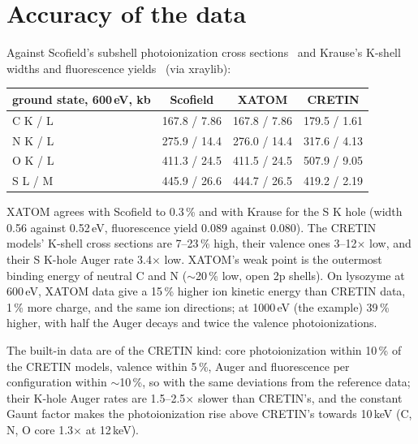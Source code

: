 \section{Accuracy of the data}
\label{sec:accuracy}

Against Scofield's subshell photoionization cross sections~\cite{scofield1973} and Krause's K-shell widths and
fluorescence yields~\cite{krause1979} (via xraylib):
\begin{table}[H]
\centering\small
\begin{tabular}{lccc}
\toprule
ground state, 600\,eV, kb & Scofield & XATOM & CRETIN \\
\midrule
C K / L & 167.8 / 7.86 & 167.8 / 7.86 & 179.5 / 1.61 \\
N K / L & 275.9 / 14.4 & 276.0 / 14.4 & 317.6 / 4.13 \\
O K / L & 411.3 / 24.5 & 411.5 / 24.5 & 507.9 / 9.05 \\
S L / M & 445.9 / 26.6 & 444.7 / 26.5 & 419.2 / 2.19 \\
\bottomrule
\end{tabular}
\end{table}
XATOM agrees with Scofield to 0.3\,\% and with Krause for the S K hole (width 0.56 against 0.52\,eV, fluorescence yield
0.089 against 0.080).
The CRETIN models' K-shell cross sections are 7--23\,\% high, their valence ones 3--12$\times$ low, and their S K-hole
Auger rate 3.4$\times$ low.
XATOM's weak point is the outermost binding energy of neutral C and N ($\sim$20\,\% low, open 2p shells).
On lysozyme at 600\,eV, XATOM data give a 15\,\% higher ion kinetic energy than CRETIN data, 1\,\% more charge, and the
same ion directions; at 1000\,eV (the example) 39\,\% higher, with half the Auger decays and twice the valence
photoionizations.

The built-in data are of the CRETIN kind: core photoionization within 10\,\% of the CRETIN models, valence within
5\,\%, Auger and fluorescence per configuration within $\sim$10\,\%, so with the same deviations from the reference
data; their K-hole Auger rates are 1.5--2.5$\times$ slower than CRETIN's, and the constant Gaunt factor makes the
photoionization rise above CRETIN's towards 10\,keV (C, N, O core 1.3$\times$ at 12\,keV).
